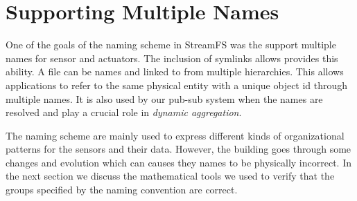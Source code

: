 \section{Supporting Multiple Names}

One of the goals of the naming scheme in StreamFS was the support multiple names for sensor and actuators.  The inclusion of symlinks
allows provides this ability.  A file can be names and linked to from multiple hierarchies.  This allows applications to refer
to the same physical entity with a unique object id through multiple names.  It is also used by our pub-sub system when
the names are resolved and play a crucial role in \emph{dynamic aggregation}.

The naming scheme are mainly used to express different kinds of organizational patterns for the sensors and their data.
However, the building goes through some changes and evolution which can causes they names to be physically incorrect.  In the next
section we discuss the mathematical tools we used to verify that the groups specified by the naming convention are correct.

